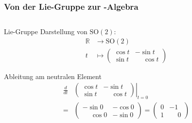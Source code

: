 %
%
%
\bgroup

\newcommand{\gSL}[2]{\ensuremath{\text{SL}(#1, \mathbb{#2})}}
\newcommand{\gSO}[1]{\ensuremath{\text{SO}(#1)}}
\newcommand{\gGL}[2]{\ensuremath{\text{GL}(#1, \mathbb #2)}}

\newcommand{\asl}[2]{\ensuremath{\mathfrak{sl}(#1, \mathbb{#2})}}
\newcommand{\aso}[1]{\ensuremath{\mathfrak{so}(#1)}}
\newcommand{\agl}[2]{\ensuremath{\mathfrak{gl}(#1, \mathbb #2)}}

\begin{frame}[t]
\setlength{\abovedisplayskip}{5pt}
\setlength{\belowdisplayskip}{5pt}
\frametitle{Von der Lie-Gruppe zur -Algebra}
\vspace{-20pt}
\begin{columns}[t,onlytextwidth]
\begin{column}{0.48\textwidth}
  \begin{block}{Lie-Gruppe}
    Darstellung von \gSO2:
    \begin{align*}
      \mathbb R 
      &\to 
      \gSO2
      \\
      t
      &\mapsto
      \begin{pmatrix}
        \cos t &         -\sin t \\ 
        \sin t & \phantom-\cos t
      \end{pmatrix}
    \end{align*}
  \end{block}
  \begin{block}{Ableitung am neutralen Element}
    \begin{align*}
    \frac{d}{d t}
    &
    \left.
    \begin{pmatrix}
      \cos t &         -\sin t \\ 
      \sin t & \phantom-\cos t
    \end{pmatrix}
    \right|_{ t = 0}
    \\
    =
    & 
    \begin{pmatrix} -\sin0 & -\cos0 \\ \phantom-\cos0 & -\sin0 \end{pmatrix}
    = 
    \begin{pmatrix} 0 & -1 \\ 1 &  \phantom-0 \end{pmatrix}
    \end{align*}
  \end{block}

\end{column}
\end{columns}
\end{frame}
